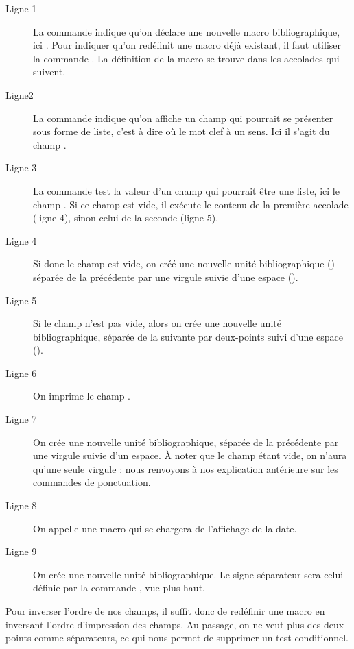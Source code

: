 \begin{description}
\item[Ligne 1]La commande  indique qu'on déclare une nouvelle macro bibliographique, ici . Pour indiquer qu'on redéfinit une macro déjà existant, il faut utiliser la commande . La définition de la macro se trouve dans les accolades qui suivent.
\item[Ligne2]La commande  indique qu'on affiche un champ qui pourrait se présenter sous forme de liste, c'est à dire où le mot clef  à un sens. Ici il s'agit du champ . \item[Ligne 3]La commande  test la valeur d'un champ qui pourrait être une liste, ici le champ . Si ce champ est vide, il exécute le contenu de la première accolade (ligne 4), sinon celui de la seconde (ligne 5).
\item[Ligne 4]Si donc le champ  est vide, on créé une nouvelle unité bibliographique () séparée de la précédente par une virgule suivie d'une espace ().
\item[Ligne 5]Si le champ  n'est pas vide, alors on crée une nouvelle unité bibliographique, séparée de la suivante par deux-points suivi d'une espace ().
\item[Ligne 6]On imprime le champ .
\item[Ligne 7]On crée une nouvelle unité bibliographique, séparée de la précédente par une virgule suivie d'un espace. À noter que le champ  étant vide, on n'aura qu'une seule virgule : nous renvoyons à nos explication antérieure sur les commandes de ponctuation.
\item[Ligne 8]On appelle une macro qui se chargera de l'affichage de la date.
\item[Ligne 9]On crée une nouvelle unité bibliographique. Le signe séparateur sera celui définie par la commande , vue plus haut.
\end{description}

Pour inverser l'ordre de nos champs, il suffit donc de redéfinir une macro en inversant l'ordre d'impression des champs. Au passage, on ne veut plus des deux points comme séparateurs, ce qui nous permet de supprimer un test conditionnel.


